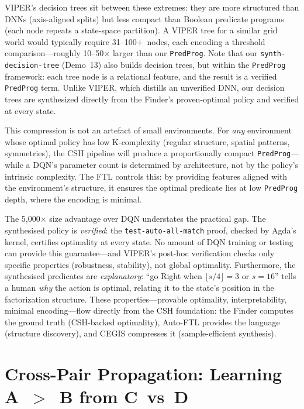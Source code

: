 VIPER's decision trees sit between these extremes: they are more structured than DNNs (axis-aligned splits) but less compact than Boolean predicate programs (each node repeats a state-space partition).  A VIPER tree for a similar grid world would typically require 31--100+~nodes, each encoding a threshold comparison---roughly 10--50$\times$ larger than our \texttt{PredProg}.  Note that our \texttt{synth-decision-tree} (Demo~13) also builds decision trees, but within the \texttt{PredProg} framework: each tree node is a relational feature, and the result is a verified \texttt{PredProg} term.  Unlike VIPER, which distills an unverified DNN, our decision trees are synthesized directly from the Finder's proven-optimal policy and verified at every state.

This compression is not an artefact of small environments.  For \emph{any} environment whose optimal policy has low K-complexity (regular structure, spatial patterns, symmetries), the CSH pipeline will produce a proportionally compact \texttt{PredProg}---while a DQN's parameter count is determined by architecture, not by the policy's intrinsic complexity.  The FTL controls this: by providing features aligned with the environment's structure, it ensures the optimal predicate lies at low \texttt{PredProg} depth, where the encoding is minimal.

\begin{remark}
The 5{,}000$\times$ size advantage over DQN understates the practical gap.  The synthesised policy is \emph{verified}: the \texttt{test-auto-all-match} proof, checked by Agda's kernel, certifies optimality at every state.  No amount of DQN training or testing can provide this guarantee---and VIPER's post-hoc verification checks only specific properties (robustness, stability), not global optimality.  Furthermore, the synthesised predicates are \emph{explanatory}: ``go Right when $\lfloor s/4 \rfloor = 3$ or $s = 16$'' tells a human \emph{why} the action is optimal, relating it to the state's position in the factorization structure.  These properties---provable optimality, interpretability, minimal encoding---flow directly from the CSH foundation: the Finder computes the ground truth (CSH-backed optimality), Auto-FTL provides the language (structure discovery), and CEGIS compresses it (sample-efficient synthesis).
\end{remark}

\section{Cross-Pair Propagation: Learning A~$>$~B from C~vs~D}
\label{sec:cross-pair}

